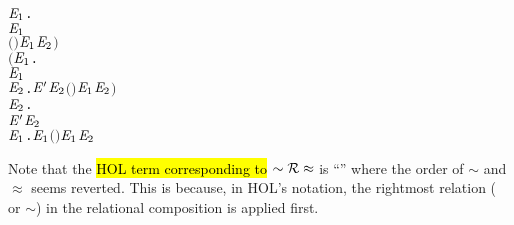\begin{definition}
\begin{alltt}
                   \HOLSymConst{\HOLTokenExists{}}\ensuremath{\HOLBoundVar{E}\sb{\mathrm{1}}}.
                        \HOLTokenWeakTransBegin{} \HOLTokenWeakTransEnd \ensuremath{\HOLBoundVar{E}\sb{\mathrm{1}}} \HOLSymConst{\HOLTokenConj{}}
                       \ensuremath{(} \HOLSymConst{\HOLTokenRCompose{}}  \HOLSymConst{\HOLTokenRCompose{}} \ensuremath{)} \ensuremath{\HOLBoundVar{E}\sb{\mathrm{1}}} \ensuremath{\HOLBoundVar{E}\sb{\mathrm{2}}}\ensuremath{)} \HOLSymConst{\HOLTokenConj{}}
          \ensuremath{(}\HOLSymConst{\HOLTokenForall{}}\ensuremath{\HOLBoundVar{E}\sb{\mathrm{1}}}.
                \HOLTokenTransBegin\HOLSymConst{\ensuremath{\tau}}\HOLTokenTransEnd \ensuremath{\HOLBoundVar{E}\sb{\mathrm{1}}} \HOLSymConst{\HOLTokenImp{}}
               \HOLSymConst{\HOLTokenExists{}}\ensuremath{\HOLBoundVar{E}\sb{\mathrm{2}}}. \ensuremath{\HOLBoundVar{E}\sp{\prime}} \HOLSymConst{\HOLTokenEPS} \ensuremath{\HOLBoundVar{E}\sb{\mathrm{2}}} \HOLSymConst{\HOLTokenConj{}} \ensuremath{(} \HOLSymConst{\HOLTokenRCompose{}}  \HOLSymConst{\HOLTokenRCompose{}} \ensuremath{)} \ensuremath{\HOLBoundVar{E}\sb{\mathrm{1}}} \ensuremath{\HOLBoundVar{E}\sb{\mathrm{2}}}\ensuremath{)} \HOLSymConst{\HOLTokenConj{}}
          \HOLSymConst{\HOLTokenForall{}}\ensuremath{\HOLBoundVar{E}\sb{\mathrm{2}}}.
              \ensuremath{\HOLBoundVar{E}\sp{\prime}} \HOLTokenTransBegin\HOLSymConst{\ensuremath{\tau}}\HOLTokenTransEnd \ensuremath{\HOLBoundVar{E}\sb{\mathrm{2}}} \HOLSymConst{\HOLTokenImp{}}
              \HOLSymConst{\HOLTokenExists{}}\ensuremath{\HOLBoundVar{E}\sb{\mathrm{1}}}.  \HOLSymConst{\HOLTokenEPS} \ensuremath{\HOLBoundVar{E}\sb{\mathrm{1}}} \HOLSymConst{\HOLTokenConj{}} \ensuremath{(} \HOLSymConst{\HOLTokenRCompose{}}  \HOLSymConst{\HOLTokenRCompose{}} \ensuremath{)} \ensuremath{\HOLBoundVar{E}\sb{\mathrm{1}}} \ensuremath{\HOLBoundVar{E}\sb{\mathrm{2}}}
\end{alltt}
\end{definition}
Note that the \hl{HOL term corresponding to} $\sim {\cal R} \approx$ is
``'' where the order of
$\sim$ and $\approx$ seems reverted. This is because, in HOL's
notation, the rightmost relation ( or $\sim$) in the relational composition is
applied first.

